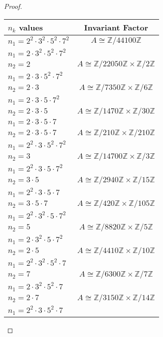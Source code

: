 \documentclass[10pt]{article}
\newcommand{\Z}{\mathbb{Z}}
\begin{document}
\begin{itemize}
\begin{proof}
\begin{item}
\begin{center}
  \begin{tabular}{ l  c }
    $n_k$ values & Invariant Factor \\ \hline
    $n_1=2^2 \cdot 3^2 \cdot 5^2 \cdot 7^2$ & $A\cong \Z / 44100\Z$ \\ \hline
	\hline    
	$n_1=2 \cdot 3^2 \cdot 5^2 \cdot 7^2$ &  \\ \hline
	$n_2=2$ & $A\cong \Z / 22050\Z \times \Z / 2\Z$ \\ \hline
    \hline
	$n_1=2 \cdot 3 \cdot 5^2 \cdot 7^2$ & \\ \hline
	$n_2=2 \cdot 3$ & $A\cong \Z / 7350\Z \times \Z / 6\Z$ \\ \hline
	\hline
	$n_1=2 \cdot 3 \cdot 5 \cdot 7^2$ & \\ \hline
	$n_2=2 \cdot 3 \cdot 5$ & $A\cong \Z / 1470\Z \times \Z / 30\Z$ \\ \hline
	\hline
	$n_1=2 \cdot 3 \cdot 5 \cdot 7$ & \\ \hline
	$n_2=2 \cdot 3 \cdot 5 \cdot 7$ & $A\cong \Z / 210\Z \times \Z / 210\Z$ \\ \hline
	\hline
	$n_1=2^2 \cdot 3 \cdot 5^2 \cdot 7^2$ &  \\ \hline
	$n_2=3$ & $A\cong \Z / 14700\Z \times \Z / 3\Z$ \\ \hline
    \hline
	$n_1=2^2 \cdot 3 \cdot 5 \cdot 7^2$ &  \\ \hline
	$n_2=3 \cdot 5$ & $A\cong \Z / 2940\Z \times \Z / 15\Z$ \\ \hline
	\hline
	$n_1=2^2 \cdot 3 \cdot 5 \cdot 7$ & \\ \hline
	$n_2=3 \cdot 5 \cdot 7$ & $A\cong \Z / 420\Z \times \Z / 105\Z$ \\ \hline
	\hline
	$n_1=2^2 \cdot 3^2 \cdot 5 \cdot 7^2$ & \\ \hline
	$n_2=5$ & $A\cong \Z / 8820\Z \times \Z / 5\Z$ \\ \hline
	\hline
	$n_1=2 \cdot 3^2 \cdot 5 \cdot 7^2$ & \\ \hline
	$n_2=2 \cdot 5$ & $A\cong \Z / 4410\Z \times \Z / 10\Z$ \\ \hline
	\hline
	$n_1=2^2 \cdot 3^2 \cdot 5^2 \cdot 7$ & \\ \hline
	$n_2=7$ & $A\cong \Z / 6300\Z \times \Z / 7\Z$ \\ \hline
	\hline
	$n_1=2 \cdot 3^2 \cdot 5^2 \cdot 7$ & \\ \hline
	$n_2=2 \cdot 7$ & $A\cong \Z / 3150\Z \times \Z / 14\Z$ \\ \hline
	\hline
	$n_1=2^2 \cdot 3 \cdot 5^2 \cdot 7$ & \\ \hline

\end{tabular}
\end{center}
\end{item}
\end{proof}
\end{itemize}
\end{document}
